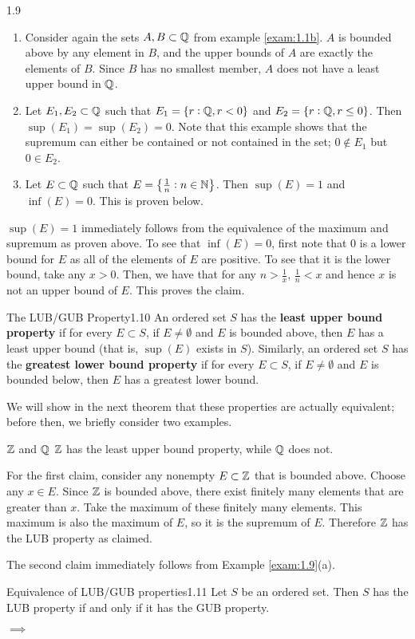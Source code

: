 \begin{example}{}{1.9}
    \begin{enumerate}
        \item Consider again the sets $A, B \subset \mathbb{Q}$ from example \ref{exam:1.1b}. $A$ is bounded above by any element in $B$, and the upper bounds of $A$ are exactly the elements of $B$. Since $B$ has no smallest member, $A$ does not have a least upper bound in $\mathbb{Q}$.
        \item Let $E_1, E_2 \subset \mathbb{Q}$ such that $E_1 = \set{r: \mathbb{Q}, r < 0}$ and $E_2 = \set{r: \mathbb{Q}, r \leq 0}$. Then $\sup(E_1) = \sup(E_2) = 0$. Note that this example shows that the supremum can either be contained or not contained in the set; $0 \notin E_1$ but $0 \in E_2$. 
        \item Let $E \subset \mathbb{Q}$ such that $E = \set{\frac{1}{n}: n \in \mathbb{N}}$. Then $\sup(E) = 1$ and $\inf(E) = 0$. This is proven below. 
    \end{enumerate}
\end{example}
\begin{nproof}
    $\sup(E) = 1$ immediately follows from the equivalence of the maximum and supremum as proven above. To see that $\inf(E) = 0$, first note that $0$ is a lower bound for $E$ as all of the elements of $E$ are positive. To see that it is the lower bound, take any $x > 0$. Then, we have that for any $n > \frac{1}{x}$, $\frac{1}{n} < x$ and hence $x$ is not an upper bound of $E$. This proves the claim.
\end{nproof}

\begin{definition}{The LUB/GUB Property}{1.10}
    An ordered set $S$ has the \textbf{least upper bound property} if for every $E \subset S$, if $E \neq \emptyset$ and $E$ is bounded above, then $E$ has a least upper bound (that is, $\sup(E)$ exists in $S$). Similarly, an ordered set $S$ has the \textbf{greatest lower bound property} if for every $E \subset S$, if $E \neq \emptyset$ and $E$ is bounded below, then $E$ has a greatest lower bound.
\end{definition}
We will show in the next theorem that these properties are actually equivalent; before then, we briefly consider two examples.
\begin{nexample}{$\mathbb{Z}$ and $\mathbb{Q}$}
    $\mathbb{Z}$ has the least upper bound property, while $\mathbb{Q}$ does not. 
\end{nexample}
\begin{nproof}
    For the first claim, consider any nonempty $E \subset \mathbb{Z}$ that is bounded above. Choose any $x \in E$. Since $\mathbb{Z}$ is bounded above, there exist finitely many elements that are greater than $x$. Take the maximum of these finitely many elements. This maximum is also the maximum of $E$, so it is the supremum of $E$. Therefore $\mathbb{Z}$ has the LUB property as claimed.
    
    The second claim immediately follows from Example \ref{exam:1.9}(a). 
\end{nproof}

\begin{theorem}{Equivalence of LUB/GUB properties}{1.11}
    Let $S$ be an ordered set. Then $S$ has the LUB property if and only if it has the GUB property. 
\end{theorem}
\begin{nproof}
    $\boxed{\implies}$
\end{nproof}